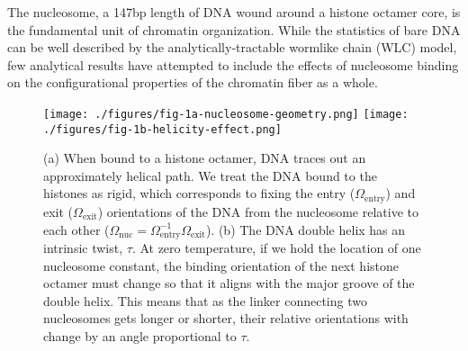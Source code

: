 \documentclass[%
 reprint,
superscriptaddress,
showpacs,preprintnumbers,
 amsmath,amssymb,
 aps,
 prl,
]{revtex4-1}
\begin{document}
\maketitle


The nucleosome, a 147bp length of DNA wound around a histone octamer core, is
the fundamental unit of chromatin organization. While the statistics of bare DNA
can be well described by the analytically-tractable wormlike chain (WLC) model,
few analytical results have attempted to include the effects of nucleosome
binding on the configurational properties of the chromatin fiber as a whole.

\begin{figure}[t]
    \centering
    \texttt{[image: ./figures/fig-1a-nucleosome-geometry.png]}
    \texttt{[image: ./figures/fig-1b-helicity-effect.png]}
    \caption{(a) When bound to a histone octamer, DNA traces out an
    approximately helical path. We treat the DNA bound to the histones as rigid,
    which corresponds to fixing the entry ($\Omega_\text{entry}$) and exit
    ($\Omega_\text{exit}$) orientations of the DNA from the nucleosome relative
    to each other ($\Omega_\text{nuc} =
    \Omega_\text{entry}^{-1}\Omega_\text{exit}$).
    (b) The DNA double helix has an intrinsic twist, $\tau$. At zero
    temperature, if we hold the location of one nucleosome constant, the binding
    orientation of the next histone octamer must change so that it aligns with
    the major groove of the double helix. This means that as the linker
    connecting two nucleosomes gets longer or shorter, their relative
    orientations with change by an angle proportional to $\tau$.}
\end{figure}
\end{document}
